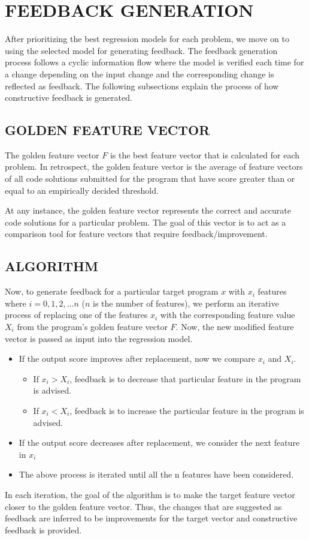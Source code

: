 
\chapter{FEEDBACK GENERATION}

After prioritizing the best regression models for each problem, we
move on to using the selected model for generating feedback. The
feedback generation process follows a cyclic information flow where
the model is verified each time for a change depending on the input
change and the corresponding change is reflected as feedback. The
following subsections explain the process of how constructive feedback
is generated.

\section{GOLDEN FEATURE VECTOR}

The golden feature vector $F$ is the best feature vector that is
calculated for each problem. In retrospect, the golden feature vector
is the average of feature vectors of all code solutions submitted for
the program that have score greater than or equal to an empirically
decided threshold.

At any instance, the golden feature vector represents the correct and
accurate code solutions for a particular problem. The goal of this
vector is to act as a comparison tool for feature vectors that require
feedback/improvement.

\section{ALGORITHM}

Now, to generate feedback for a particular target program $x$ with
$x_{i}$ features where $i = 0,1,2, \ldots n$ ($n$ is the number of
features), we perform an iterative process of replacing one of the
features $x_{i}$ with the corresponding feature value $X_{i}$ from the
program's golden feature vector $F$. Now, the new modified feature
vector is passed as input into the regression model.

\begin{itemize}
\item If the output score improves after replacement, now we compare
  $x_{i}$ and $X_{i}$.
  \begin{itemize}
  \item If $x_{i} > X_{i}$, feedback is to decrease that particular
    feature in the program is advised.
  \item If $x_{i}<X_{i}$, feedback is to increase the particular
    feature in the program is advised.
  \end{itemize}
\item If the output score decreases after replacement, we consider the
  next feature in $x_{i}$
\item The above process is iterated until all the n features have been
  considered.
\end{itemize}

In each iteration, the goal of the algorithm is to make the target
feature vector closer to the golden feature vector. Thus, the changes
that are suggested as feedback are inferred to be improvements
for the target vector and constructive feedback is provided.
